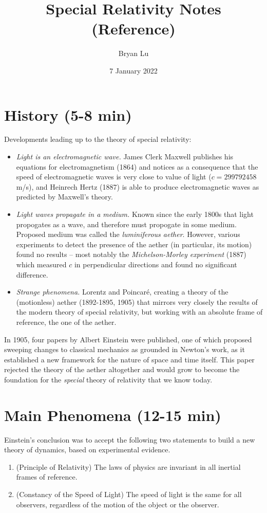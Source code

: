 \documentclass[12pt]{scrartcl}
\title{Special Relativity Notes (Reference)}
\author{Bryan Lu}
\date{7 January 2022} %
\begin{document}
\maketitle

\section{History (5-8 min)}
Developments leading up to the theory of special relativity:
\begin{itemize}
	\item \textit{Light is an electromagnetic wave.} James Clerk Maxwell publishes his equations for electromagnetism (1864) and notices as a consequence that the speed of electromagnetic waves is very close to value of light ($c = 299792458$ m/s), and Heinrech Hertz (1887) is able to produce electromagnetic waves as predicted by Maxwell's theory.
	\item \textit{Light waves propagate in a medium.} Known since the early 1800s that light propogates as a wave, and therefore must propogate in some medium. Proposed medium was called the \textit{luminiferous aether}. However, various experiments to detect the presence of the aether (in particular, its motion) found no results -- most notably the \textit{Michelson-Morley experiment} (1887) which measured $c$ in perpendicular directions and found no significant difference.
	\item \textit{Strange phenomena.} Lorentz and Poincar\'e, creating a theory of the (motionless) aether (1892-1895, 1905) that mirrors very closely the results of the modern theory of special relativity, but working with an absolute frame of reference, the one of the aether.
\end{itemize}

In 1905, four papers by Albert Einstein were published, one of which proposed sweeping changes to classical mechanics as grounded in Newton's work, as it established a new framework for the nature of space and time itself. This paper rejected the theory of the aether altogether and would grow to become the foundation for the \textit{special} theory of relativity that we know today.

\section{Main Phenomena (12-15 min)}
Einstein's conclusion was to accept the following two statements to build a new theory of dynamics, based on experimental evidence.
\begin{enumerate}
	\item (Principle of Relativity) The laws of physics are invariant in all inertial frames of reference.
	\item (Constancy of the Speed of Light) The speed of light is the same for all observers, regardless of the motion of the object or the observer.
\end{enumerate}
\end{document}
